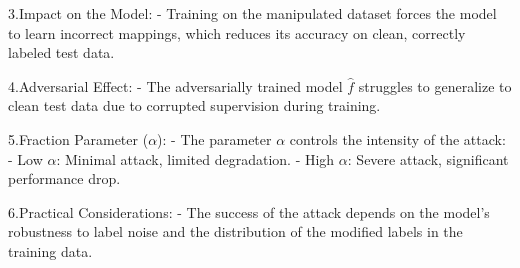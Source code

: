 3.Impact on the Model:
   - Training on the manipulated dataset forces the model to learn incorrect mappings, which reduces its accuracy on clean, correctly labeled test data.

4.Adversarial Effect:
   - The adversarially trained model $\hat{f}$ struggles to generalize to clean test data due to corrupted supervision during training.

5.Fraction Parameter ($\alpha$):
   - The parameter $\alpha$ controls the intensity of the attack:
     - Low $\alpha$: Minimal attack, limited degradation.
     - High $\alpha$: Severe attack, significant performance drop.

6.Practical Considerations:
   - The success of the attack depends on the model's robustness to label noise and the distribution of the modified labels in the training data.